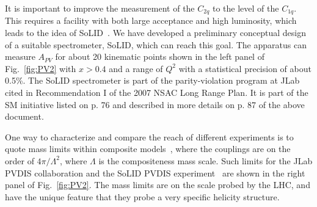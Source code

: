 \documentclass[12pt]{article}
\begin{document}


It is important to improve the measurement of the $C_{2q}$ to the level of the $C_{1q}$.  This requires a facility with both large acceptance and high luminosity, which leads to the idea of SoLID~\cite{Souder:2007zze,Souder:2005tz}.  We have developed a preliminary conceptual design of a suitable spectrometer, SoLID, which can reach this goal.  The apparatus can measure $A_{PV}$ for about 20 kinematic points shown in the left panel of Fig.~\ref{fig:PV2} with $x>0.4$ and a range of $Q^2$ with a statistical precision of about 0.5\%.  The SoLID spectrometer is part of the parity-violation program at JLab cited in Recommendation I of the 2007 NSAC Long Range Plan.  It is part of the SM initiative listed on p. 76 and described in more details on p. 87 of the above document. 

One way to characterize and compare the reach of different experiments is to quote mass limits within composite models~\cite{Eichten:1983hw}, where the couplings are on the order of $4\pi/\Lambda^2$, where $\Lambda$ is the compositeness mass scale.  Such limits for the JLab PVDIS collaboration and the SoLID PVDIS experiment~\cite{Erler:2014fqa} are shown in the right panel of Fig.~\ref{fig:PV2}.  The mass limits are on the scale probed by the LHC, and have the unique feature that they probe a very specific helicity structure.      
\end{document}
